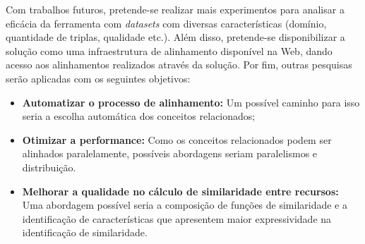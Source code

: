 Com trabalhos futuros, pretende-se realizar mais experimentos para analisar a eficácia da ferramenta com \textit{datasets} com diversas características (domínio, quantidade de triplas, qualidade etc.). Além disso, pretende-se disponibilizar a solução como uma infraestrutura de alinhamento disponível na Web, dando acesso aos alinhamentos realizados através da solução. Por fim, outras pesquisas serão aplicadas com os seguintes objetivos:
\begin{itemize}
\item \textbf{Automatizar o processo de alinhamento:} Um possível caminho para isso seria a escolha automática dos conceitos relacionados;
\item \textbf{Otimizar a performance:} Como os conceitos relacionados podem ser alinhados paralelamente, possíveis abordagens seriam paralelismos e distribuição.
\item \textbf{Melhorar a qualidade no cálculo de similaridade entre recursos:} Uma abordagem possível seria a composição de funções de similaridade e a identificação de características que apresentem maior expressividade na identificação de similaridade.
\end{itemize}

